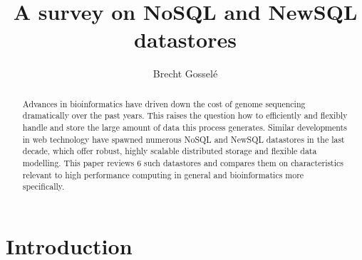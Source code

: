 \documentclass{IEEEtran}
\begin{document}
\title{A survey on NoSQL and NewSQL datastores}
\author{Brecht Gossel\'e}
\maketitle

\begin{abstract}
Advances in bioinformatics have driven down the cost of genome sequencing dramatically over the past years. This raises the question how to efficiently and flexibly handle and store the large amount of data this process generates. Similar developments in web technology have spawned numerous NoSQL and NewSQL datastores in the last decade, which offer robust, highly scalable distributed storage and flexible data modelling. This paper reviews 6 such datastores and compares them on characteristics relevant to high performance computing in general and bioinformatics more specifically.
\end{abstract}


\section{Introduction}
\end{document}
